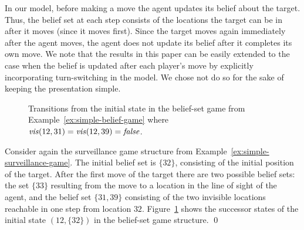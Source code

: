 \begin{itemize}
\end{itemize}

 In our model, before making a move the agent updates its belief about the target. Thus, the belief set at each step consists of the locations the target can be in after it moves (since it moves first). Since the target moves again immediately after the agent moves, the agent does not update its belief after it completes its own move. We note that the results in this paper can be easily extended to the case when the belief is updated after each player's move by explicitly incorporating turn-switching in the model. We chose not do so for the sake of keeping the presentation simple.

\begin{figure}

\caption{Transitions from the initial state in the belief-set game from Example~\ref{ex:simple-belief-game} where $\mathit{vis}(12,31) = \mathit{vis}(12,39) = \mathit{false}$.}
\label{fig:simple-belief-game}
\end{figure}

\begin{example}\label{ex:simple-belief-game}
Consider again the surveillance game structure from Example~\ref{ex:simple-surveillance-game}. The initial belief set is $\{32\}$, consisting of the initial position of the target. After the first move of the target there are two possible belief sets: the set $\{33\}$ resulting from the move to a location in the line of sight of the agent, and the belief set $\{31,39\}$ consisting of the two invisible locations reachable in one step from location $32$.
Figure~\ref{fig:simple-belief-game} shows the successor states of the initial state $(12,\{32\})$ in the belief-set game structure. \qed
\end{example}

